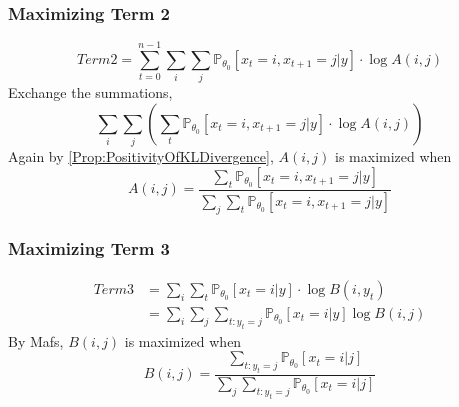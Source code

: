         \subsubsection{Maximizing Term 2}
        \[ Term2 = \sum_{t=0}^{n-1}\sum_i\sum_j \mathbb{P}_{\theta_0}[x_t=i,x_{t+1}=j|y] \cdot \log A(i,j) \]
        Exchange the summations,
        \[ \sum_i\sum_j \left(\sum_t \mathbb{P}_{\theta_0}[x_t=i,x_{t+1}=j|y] \cdot \log A(i,j)\right) \]
        Again by \ref{Prop:PositivityOfKLDivergence}, $A(i,j)$ is maximized when
        \[ A(i,j) = \frac{\sum_t \mathbb{P}_{\theta_0}[x_t=i,x_{t+1}=j|y]}{\sum_j\sum_t \mathbb{P}_{\theta_0}[x_t=i,x_{t+1}=j|y]} \]

        \subsubsection{Maximizing Term 3}
        \begin{align*}
            Term3 &= \sum_i \sum_t \mathbb{P}_{\theta_0}[x_t=i|y]\cdot\log B(i,y_t)\\
            &= \sum_i \sum_j \sum_{t:y_t=j}\mathbb{P}_{\theta_0}[x_t=i|y]\log B(i,j)
        \end{align*}
        By Mafs, $B(i,j)$ is maximized when
        \[ B(i,j) = \frac{\sum_{t:y_t=j}\mathbb{P}_{\theta_0}[x_t=i|j]}{\sum_j\sum_{t:y_t=j}\mathbb{P}_{\theta_0}[x_t=i|j]} \]
